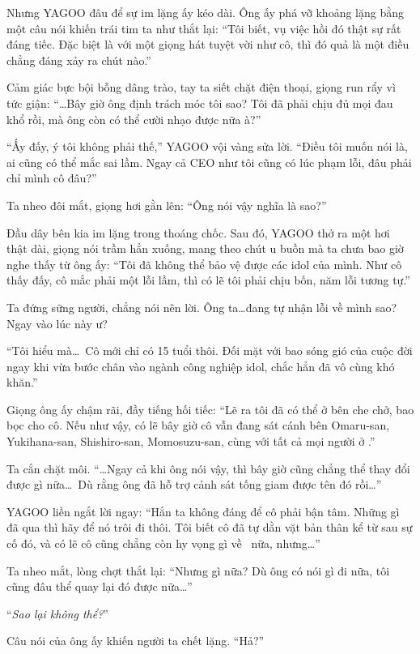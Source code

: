 \documentclass[../main.tex]{subfiles}
\begin{document}
Nhưng YAGOO đâu để sự im lặng ấy kéo dài. Ông ấy phá vỡ khoảng lặng bằng một câu nói khiến trái tim ta như thắt lại: ``Tôi biết, vụ việc hồi đó thật sự rất đáng tiếc. Đặc biệt là với một giọng hát tuyệt vời như cô, thì đó quả là một điều chẳng đáng xảy ra chút nào.''

Cảm giác bực bội bỗng dâng trào, tay ta siết chặt điện thoại, giọng run rẩy vì tức giận: ``\dots Bây giờ ông định trách móc tôi sao? Tôi đã phải chịu đủ mọi đau khổ rồi, mà ông còn có thể cười nhạo được nữa à?''

``Ấy đấy, ý tôi không phải thế,'' YAGOO vội vàng sửa lời. ``Điều tôi muốn nói là, ai cũng có thể mắc sai lầm. Ngay cả CEO như tôi cũng có lúc phạm lỗi, đâu phải chỉ mình cô đâu?''

Ta nheo đôi mắt, giọng hơi gằn lên: ``Ông nói vậy nghĩa là sao?''

Đầu dây bên kia im lặng trong thoáng chốc. Sau đó, YAGOO thở ra một hơi thật dài, giọng nói trầm hẳn xuống, mang theo chút u buồn mà ta chưa bao giờ nghe thấy từ ông ấy: ``Tôi đã không thể bảo vệ được các idol của mình. Như cô thấy đấy, cô mắc phải một lỗi lầm, thì có lẽ tôi phải chịu bốn, năm lỗi tương tự.''

Ta đứng sững người, chẳng nói nên lời. Ông ta\dots đang tự nhận lỗi về mình sao? Ngay vào lúc này ư?

``Tôi hiểu mà\dots\ Cô mới chỉ có 15 tuổi thôi. Đối mặt với bao sóng gió của cuộc đời ngay khi vừa bước chân vào ngành công nghiệp idol, chắc hẳn đã vô cùng khó khăn.''

Giọng ông ấy chậm rãi, đầy tiếng hối tiếc: ``Lẽ ra tôi đã có thể ở bên che chở, bao bọc cho cô. Nếu như vậy, có lẽ bây giờ cô vẫn đang sát cánh bên Omaru-san, Yukihana-san, Shishiro-san, Momosuzu-san, cùng với tất cả mọi người ở \hll.''

Ta cắn chặt môi. ``\dots Ngay cả khi ông nói vậy, thì bây giờ cũng chẳng thể thay đổi được gì nữa\dots\ Dù rằng ông đã hỗ trợ cảnh sát tống giam được tên đó rồi\dots''

YAGOO liền ngắt lời ngay: ``Hắn ta không đáng để cô phải bận tâm. Những gì đã qua thì hãy để nó trôi đi thôi. Tôi biết cô đã tự dằn vặt bản thân kể từ sau sự cố đó, và có lẽ cô cũng chẳng còn hy vọng gì về \hll\ nữa, nhưng\dots''

Ta nheo mắt, lòng chợt thắt lại: ``Nhưng gì nữa? Dù ông có nói gì đi nữa, tôi cũng đâu thể quay lại đó được nữa\dots''

``\emph{Sao lại không thể?}''

Câu nói của ông ấy khiến người ta chết lặng. ``Hả?''
\end{document}
